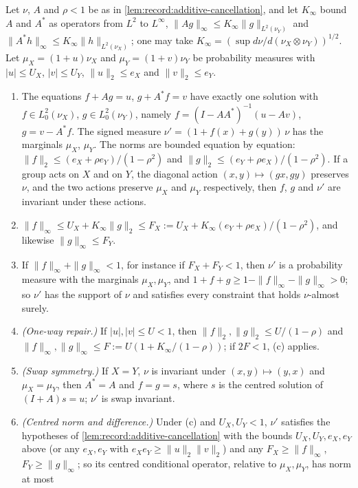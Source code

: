\begin{lemma}\label{lem:tr:repair}
Let $\nu$, $A$ and $\rho<1$ be as in \cref{lem:record:additive-cancellation},
and let $K_\infty$ bound $A$ and $A^*$ as operators from $L^2$ to $L^\infty$,
$\|Ag\|_\infty\le K_\infty\|g\|_{L^2(\nu_Y)}$ and
$\|A^*h\|_\infty\le K_\infty\|h\|_{L^2(\nu_X)}$; one may take
$K_\infty=(\sup d\nu/d(\nu_X\otimes\nu_Y))^{1/2}$. Let $\mu_X=(1+u)\nu_X$ and
$\mu_Y=(1+v)\nu_Y$ be probability measures with $|u|\le U_X$, $|v|\le U_Y$,
$\|u\|_2\le e_X$ and $\|v\|_2\le e_Y$.
\begin{enumerate}[label=\textup{(\alph*)}]
\item The equations $f+Ag=u$, $g+A^*f=v$ have exactly one solution with
 $f\in L^2_0(\nu_X)$, $g\in L^2_0(\nu_Y)$, namely
 $f=(I-AA^*)^{-1}(u-Av)$, $g=v-A^*f$. The signed measure
 $\nu'=(1+f(x)+g(y))\,\nu$ has the marginals $\mu_X$, $\mu_Y$. The norms are
 bounded equation by equation:
 $\|f\|_2\le(e_X+\rho e_Y)/(1-\rho^2)$ and $\|g\|_2\le(e_Y+\rho e_X)/(1-\rho^2)$.
 If a group acts on $X$ and on $Y$, the diagonal action
 $(x,y)\mapsto(gx,gy)$ preserves $\nu$, and the two actions preserve
 $\mu_X$ and $\mu_Y$ respectively, then $f$, $g$ and $\nu'$ are invariant
 under these actions.
\item $\|f\|_\infty\le U_X+K_\infty\|g\|_2\le F_X:=U_X+K_\infty(e_Y+\rho e_X)/(1-\rho^2)$,
 and likewise $\|g\|_\infty\le F_Y$.
\item If $\|f\|_\infty+\|g\|_\infty<1$, for instance if $F_X+F_Y<1$, then $\nu'$ is
 a probability measure with the marginals $\mu_X,\mu_Y$, and
 $1+f+g\ge1-\|f\|_\infty-\|g\|_\infty>0$; so $\nu'$ has the support of $\nu$ and
 satisfies every constraint that holds $\nu$-almost surely.
\item \emph{(One-way repair.)} If $|u|,|v|\le U<1$, then
 $\|f\|_2,\|g\|_2\le U/(1-\rho)$ and $\|f\|_\infty,\|g\|_\infty\le
 F:=U(1+K_\infty/(1-\rho))$; if $2F<1$, (c) applies.
\item \emph{(Swap symmetry.)} If $X=Y$, $\nu$ is invariant under
 $(x,y)\mapsto(y,x)$ and $\mu_X=\mu_Y$, then $A^*=A$ and $f=g=s$, where $s$ is
 the centred solution of $(I+A)s=u$; $\nu'$ is swap invariant.
\item \emph{(Centred norm and difference.)} Under (c) and $U_X,U_Y<1$, $\nu'$
 satisfies the hypotheses of \cref{lem:record:additive-cancellation} with the
 bounds $U_X,U_Y,e_X,e_Y$ above (or any $e_X,e_Y$ with
 $e_Xe_Y\ge\|u\|_2\|v\|_2$) and any $F_X\ge\|f\|_\infty$, $F_Y\ge\|g\|_\infty$; so
 its centred conditional operator, relative to $\mu_X,\mu_Y$, has norm at most

\end{enumerate}
\end{lemma}
